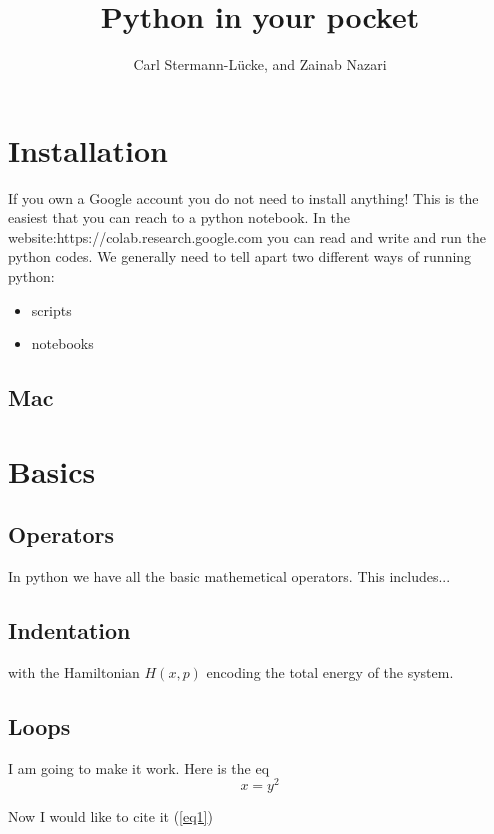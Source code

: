 \documentclass[10pt,a4paper]{article}
\author{Carl Stermann-L\"ucke, and Zainab Nazari}
\title{Python in your pocket}
\begin{document}
\maketitle
\tableofcontents
\section{Installation}
If you own a Google account you do not need to install anything! This is the easiest that you can reach to a python notebook.
In the website:https://colab.research.google.com you can read and write and run the python codes.
We generally need to tell apart two different ways of running python:
\begin{itemize}
\item scripts
\item notebooks
\end{itemize}
\subsection{Mac}
\section{Basics}
\subsection{Operators}
In python we have all the basic mathemetical operators. This includes...
\subsection{Indentation}
with the Hamiltonian $H(x,p)$ encoding the total energy of the system.
\subsection{Loops}

I am going to make it work. \cite{al} Here is the eq
\begin{equation}\label{eq1}
x=y^2
\end{equation}


Now I would like to cite it (\ref{eq1})


\end{document}
